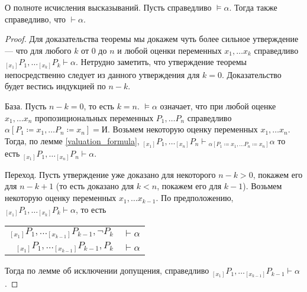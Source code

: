 \begin{theorem}{О полноте исчисления высказываний.}
Пусть справедливо $\models \alpha$. Тогда также справедливо, что $\vdash \alpha$.
\end{theorem}

\begin{proof}
Для доказательства теоремы мы докажем чуть более сильное утверждение --- что 
для любого $k$ от $0$ до $n$ и любой
оценки переменных $x_1, \dots x_k$ справедливо 
$_{[x_1]} P_1, \dots _{[x_k]} P_k \vdash \alpha$.
Нетрудно заметить, что утверждение теоремы непосредственно следует из данного 
утверждения для $k=0$. 
Доказательство будет вестись индукцией по $n-k$.

База. Пусть $n-k=0$, то есть $k=n$. 
$\models \alpha$ означает, что при любой оценке 
$x_1, \dots x_n$ пропозициональных переменных $P_1, \dots P_n$
справедливо $\alpha [P_1 \coloneqq  x_1, \dots P_n \coloneqq  x_n] = \texttt{И}$.
Возьмем некоторую оценку переменных
$x_1, \dots x_n$. Тогда, по лемме \ref{valuation_formula},
$_{[x_1]} P_1, \dots _{[x_{n}]} P_{n} \vdash {_{\alpha [P_1 \coloneqq  x_1, \dots P_n \coloneqq  x_n]} \alpha}$
то есть $_{[x_1]} P_1, \dots _{[x_{n}]} P_{n} \vdash \alpha$.

Переход. Пусть утверждение уже доказано для некоторого $n-k > 0$, покажем его
для $n-k+1$ (то есть доказано для $k < n$, покажем его для $k-1$).
Возьмем некоторую оценку переменных $x_1, \dots x_{k-1}$.
По предположению, $_{[x_1]} P_1, \dots _{[x_{k}]} P_{k} \vdash \alpha$, то есть

\begin{tabular}{rl}
$_{[x_1]} P_1, \dots _{[x_{k-1}]} P_{k-1}, \neg P_{k}$ & $\vdash \alpha$\\
$_{[x_1]} P_1, \dots _{[x_{k-1}]} P_{k-1}, P_{k}$ & $\vdash \alpha$
\end{tabular}

Тогда по лемме об исключении допущения, справедливо 
$_{[x_1]} P_1, \dots _{[x_{k-1}]} P_{k-1} \vdash \alpha$.

\end{proof}

%
%

